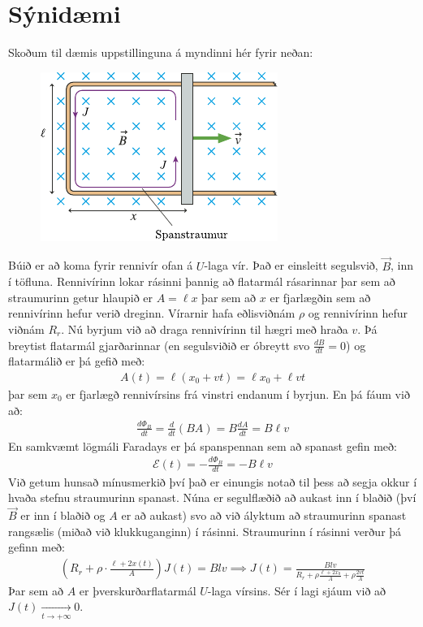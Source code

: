 \ifdefined \wholebook \else\documentclass[oneside]{book}\usepackage{EdlBook}\graphicspath{{figures/}}
\begin{document}
\newpage

\section{Sýnidæmi}

Skoðum til dæmis uppstillinguna á myndinni hér fyrir neðan:

\begin{figure}[H]
    \centering
    \includegraphics{figures/rk3026.pdf}
\end{figure}

Búið er að koma fyrir rennivír ofan á $U$-laga vír. Það er einsleitt segulsvið, $\vec{B}$, inn í töfluna. Rennivírinn lokar rásinni þannig að flatarmál rásarinnar þar sem að straumurinn getur hlaupið er $A = \ell x$ þar sem að $x$ er fjarlægðin sem að rennivírinn hefur verið dreginn. Vírarnir hafa eðlisviðnám $\rho$ og rennivírinn hefur viðnám $R_r$. Nú byrjum við að draga rennivírinn til hægri með hraða $v$. Þá breytist flatarmál gjarðarinnar (en segulsviðið er óbreytt svo $\frac{dB}{dt} = 0$) og flatarmálið er þá gefið með:
\begin{align*}
    A(t) = \ell (x_0 + vt) = \ell x_0 + \ell vt
\end{align*}
þar sem $x_0$ er fjarlægð rennivírsins frá vinstri endanum í byrjun. En þá fáum við að:
\begin{align*}
    \frac{d \Phi_B}{dt} = \frac{d}{dt}\left( BA \right) = B \frac{dA}{dt} = B\ell v
\end{align*}
En samkvæmt lögmáli Faradays er þá spanspennan sem að spanast gefin með:
\begin{align*}
    \mathcal{E}(t) = - \frac{d\Phi_B}{dt} = - B\ell v
\end{align*}
Við getum hunsað mínusmerkið því það er einungis notað til þess að segja okkur í hvaða stefnu straumurinn spanast. Núna er segulflæðið að aukast inn í blaðið (því $\vec{B}$ er inn í blaðið og $A$ er að aukast) svo að við ályktum að straumurinn spanast rangsælis (miðað við klukkuganginn) í rásinni. Straumurinn í rásinni verður þá gefinn með:
\begin{align*}
    \left(R_r + \rho \cdot \frac{\ell + 2x(t)}{A}\right)J(t) = Blv \implies J(t) = \frac{Blv}{R_r + \rho \frac{\ell + 2x_0}{A} + \rho \frac{2vt}{A}}
\end{align*}
Þar sem að $A$ er þverskurðarflatarmál $U$-laga vírsins. Sér í lagi sjáum við að $J(t) \xrightarrow[t \to +\infty] \ 0$. \\
\end{document}
